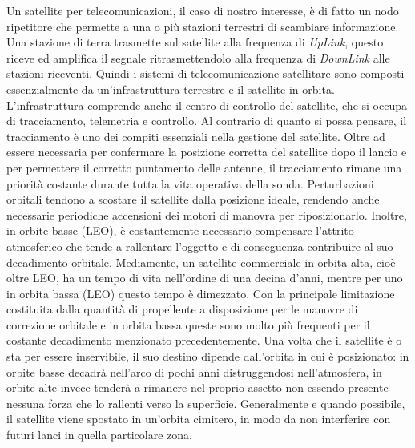 \documentclass[12pt,a4paper,oneside]{book}
\begin{document}
			Un satellite per telecomunicazioni, il caso di nostro interesse, è di fatto un nodo ripetitore che permette a una o più stazioni terrestri di scambiare informazione. Una stazione di terra trasmette sul satellite alla frequenza di {\it UpLink}, questo riceve ed amplifica il segnale ritrasmettendolo alla frequenza di {\it DownLink} alle stazioni riceventi. Quindi i sistemi di telecomunicazione satellitare sono composti essenzialmente da un'infrastruttura terrestre e il satellite in orbita. L'infrastruttura comprende anche il centro di controllo del satellite, che si occupa di tracciamento, telemetria e controllo. Al contrario di quanto si possa pensare, il tracciamento è uno dei compiti essenziali nella gestione del satellite. Oltre ad essere necessaria per confermare la posizione corretta del satellite dopo il lancio e per permettere il corretto puntamento delle antenne, il tracciamento rimane una priorità costante durante tutta la vita operativa della sonda. Perturbazioni orbitali tendono a scostare il satellite dalla posizione ideale, rendendo anche necessarie periodiche accensioni dei motori di manovra per riposizionarlo. Inoltre, in orbite basse (LEO), è costantemente necessario compensare l'attrito atmosferico che tende a rallentare l'oggetto e di conseguenza contribuire al suo decadimento orbitale. 
			Mediamente, un satellite commerciale in orbita alta, cioè oltre LEO, ha un tempo di vita nell'ordine di una decina d'anni, mentre per uno in orbita bassa (LEO) questo tempo è dimezzato. Con la principale limitazione costituita dalla quantità di propellente a disposizione per le manovre di correzione orbitale e in orbita bassa queste sono molto più frequenti per il costante decadimento menzionato precedentemente. Una volta che il satellite è o sta per essere inservibile, il suo destino dipende dall'orbita in cui è posizionato: in orbite basse decadrà nell'arco di pochi anni distruggendosi nell'atmosfera, in orbite alte invece tenderà a rimanere nel proprio assetto non essendo presente nessuna forza che lo rallenti verso la superficie. Generalmente e quando possibile, il satellite viene spostato in un'orbita cimitero, in modo da non interferire con futuri lanci in quella particolare zona. 
			
\end{document}

